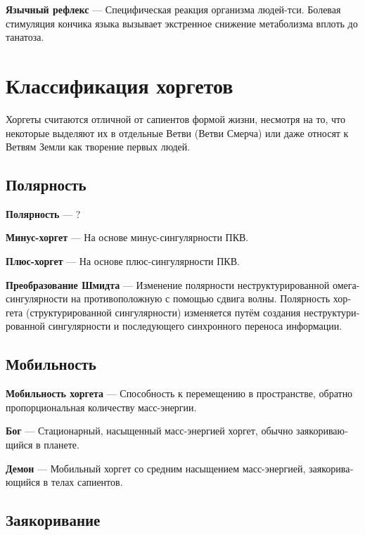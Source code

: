 \documentclass[a4paper,12pt,fleqn]{book}\usepackage{polyglossia}\setdefaultlanguage[babelshorthands=true]{russian}\setotherlanguage{english}\defaultfontfeatures{Ligatures=TeX,Mapping=tex-text}\usepackage{xcolor}\newcommand{\ml}[3]{#2}
\newcommand{\asterism}{\vspace{1em}{\centering\Large\bfseries$\ast~\ast~\ast$\par}\vspace{1em}}
\newcommand{\theterm}[3]{\textbf{\hypertarget{#1}{#2}} --- #3}
\begin{document}
\theterm{lingual-reflex}
{Язычный рефлекс}
{Специфическая реакция организма людей-тси.
Болевая стимуляция кончика языка вызывает экстренное снижение метаболизма вплоть до танатоза.}

\chapter{Классификация хоргетов}

Хоргеты считаются отличной от сапиентов формой жизни, несмотря на то, что некоторые выделяют их в отдельные Ветви (Ветви Смерча) или даже относят к Ветвям Земли как творение первых людей.

\section{Полярность}

\theterm{polarity}
{Полярность}
{?}

\asterism

\theterm{minus-jorget}
{Минус-хоргет}
{На основе минус-сингулярности ПКВ.}

\theterm{plus-jorget}
{Плюс-хоргет}
{На основе плюс-сингулярности ПКВ.}

\theterm{schmidt-transformation}
{Преобразование Шмидта}
{Изменение полярности неструктурированной омега-сингулярности на противоположную с помощью сдвига волны.
Полярность хоргета (структурированной сингулярности) изменяется путём создания неструктурированной сингулярности и последующего синхронного переноса информации.}

\section{Мобильность}

\theterm{mobility}
{Мобильность хоргета}
{Способность к перемещению в пространстве, обратно пропорциональная количеству масс-энергии.}

\asterism

\theterm{god}
{Бог}
{Стационарный, насыщенный масс-энергией хоргет, обычно заякоривающийся в планете.}

\theterm{daemon}
{Демон}
{Мобильный хоргет со средним насыщением масс-энергией, заякоривающийся в телах сапиентов.}

\section{Заякоривание}
\end{document}
